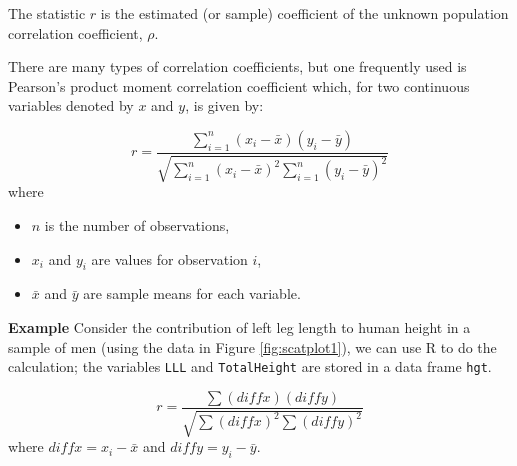 \documentclass[
  oneside]{krantz}
\newenvironment{Shaded}{\begin{snugshade}}{\end{snugshade}}
\newcommand{\CommentTok}[1]{\textcolor[rgb]{0.56,0.35,0.01}{\textit{#1}}}
\newcommand{\DecValTok}[1]{\textcolor[rgb]{0.00,0.00,0.81}{#1}}
\newcommand{\DocumentationTok}[1]{\textcolor[rgb]{0.56,0.35,0.01}{\textbf{\textit{#1}}}}
\newcommand{\FunctionTok}[1]{\textcolor[rgb]{0.00,0.00,0.00}{#1}}
\newcommand{\NormalTok}[1]{#1}
\newcommand{\OtherTok}[1]{\textcolor[rgb]{0.56,0.35,0.01}{#1}}
\newcommand{\SpecialCharTok}[1]{\textcolor[rgb]{0.00,0.00,0.00}{#1}}
\providecommand{\tightlist}{%
  \setlength{\itemsep}{0pt}\setlength{\parskip}{0pt}}
\begin{document}
The statistic \(r\) is the estimated (or sample) coefficient of the unknown population correlation coefficient, \(\rho\).

There are many types of correlation coefficients, but one frequently used is Pearson's product moment correlation coefficient which, for two continuous variables denoted by \(x\) and \(y\), is given by:

\[r=\frac{\sum_{i=1}^{n}(x_i-\bar{x})(y_i-\bar{y})}{\sqrt{\sum_{i=1}^{n}(x_i-\bar{x})^2\sum_{i=1}^{n}(y_i-\bar{y})^2}}\]
where

\begin{itemize}
\tightlist
\item
  \(n\) is the number of observations,
\item
  \(x_i\) and \(y_i\) are values for observation \(i\),
\item
  \(\bar x\) and \(\bar y\) are sample means for each variable.
\end{itemize}

\textbf{Example} Consider the contribution of left leg length to human height in a sample of men (using the data in Figure \ref{fig:scatplot1}), we can use R to do the calculation; the variables \texttt{LLL} and \texttt{TotalHeight} are stored in a data frame \texttt{hgt}.

\[r=\frac{\sum(diffx)(diffy)}{\sqrt{\sum (diffx)^2\sum(diffy)^2}}\]
where \(diffx = x_i - \bar x\) and \(diffy = y_i - \bar y\).

\begin{Shaded}
\end{Shaded}
\end{document}
